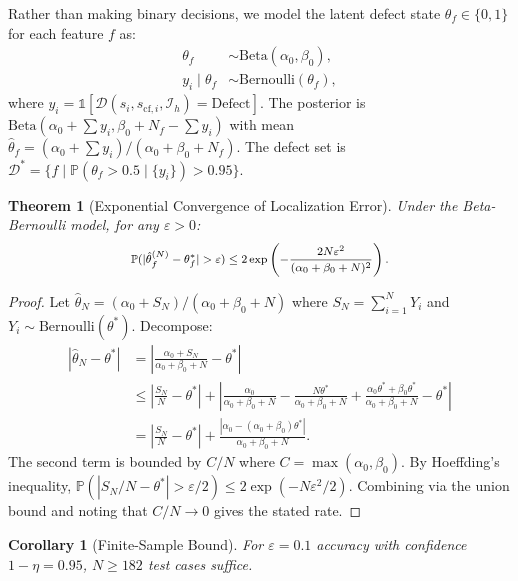 \documentclass[journal]{IEEEtran}
\theoremstyle{plain}
\newtheorem{theorem}{Theorem}[section]
\newtheorem{corollary}{Corollary}[section]
\newcommand{\fwleq}[1]{\begin{equation}\medmath{#1}\end{equation}}
\newcommand{\diag}{\mathcal{D}}
\newcommand{\ind}{\mathds{1}}
\newcommand{\Prob}{\mathbb{P}}
\begin{document}
Rather than making binary decisions, we model the latent defect state $\theta_f \in \{0,1\}$ for each feature $f$ as:
\begin{align}
\theta_f &\sim \text{Beta}(\alpha_0, \beta_0), \\
y_i \mid \theta_f &\sim \text{Bernoulli}(\theta_f),
\end{align}
where $y_i = \ind[\diag(s_i, s_{\text{cf},i}, \mathcal{I}_h) = \text{Defect}]$. The posterior is $\text{Beta}(\alpha_0 + \sum y_i, \beta_0 + N_f - \sum y_i)$ with mean $\hat{\theta}_f = (\alpha_0 + \sum y_i)/(\alpha_0 + \beta_0 + N_f)$. The defect set is $\mathcal{D}^* = \{f \mid \Prob(\theta_f > 0.5 \mid \{y_i\}) > 0.95\}$.

\begin{theorem}[Exponential Convergence of Localization Error]\label{thm:convergence}
Under the Beta-Bernoulli model, for any $\varepsilon > 0$:
\fwleq{\Prob(|\hat{\theta}_f^{(N)} - \theta_f^*| > \varepsilon) \leq 2\exp\left(-\frac{2N\varepsilon^2}{(\alpha_0+\beta_0+N)^2}\right).}
\end{theorem}

\begin{proof}
Let $\hat{\theta}_N = (\alpha_0 + S_N)/(\alpha_0 + \beta_0 + N)$ where $S_N = \sum_{i=1}^N Y_i$ and $Y_i \sim \text{Bernoulli}(\theta^*)$. Decompose:
\begin{align}
|\hat{\theta}_N - \theta^*| &= \left|\frac{\alpha_0 + S_N}{\alpha_0 + \beta_0 + N} - \theta^*\right| \\
&\leq \left|\frac{S_N}{N} - \theta^*\right| + \left|\frac{\alpha_0}{\alpha_0+\beta_0+N} - \frac{N\theta^*}{\alpha_0+\beta_0+N} + \frac{\alpha_0\theta^* + \beta_0\theta^*}{\alpha_0+\beta_0+N} - \theta^*\right| \\
&= \left|\frac{S_N}{N} - \theta^*\right| + \frac{|\alpha_0 - (\alpha_0+\beta_0)\theta^*|}{\alpha_0+\beta_0+N}.
\end{align}
The second term is bounded by $C/N$ where $C = \max(\alpha_0, \beta_0)$. By Hoeffding's inequality, $\Prob(|S_N/N - \theta^*| > \varepsilon/2) \leq 2\exp(-N\varepsilon^2/2)$. Combining via the union bound and noting that $C/N \to 0$ gives the stated rate.
\end{proof}

\begin{corollary}[Finite-Sample Bound]\label{cor:sample}
For $\varepsilon = 0.1$ accuracy with confidence $1-\eta = 0.95$, $N \geq 182$ test cases suffice.
\end{corollary}
\end{document}
